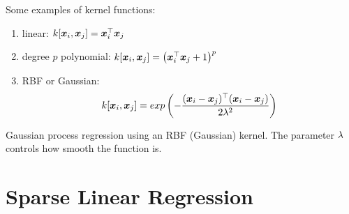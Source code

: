Some examples of kernel functions:
\begin{enumerate}
	\item linear: $k[\boldsymbol{x}_i,\boldsymbol{x}_j]=\boldsymbol{x}_i^\top\boldsymbol{x}_j$
	\item degree $p$ polynomial: $k[\boldsymbol{x}_i,\boldsymbol{x}_j]=\left(\boldsymbol{x}_i^\top\boldsymbol{x}_j+1\right)^p$
	\item RBF or Gaussian:
	\begin{align*}
		k[\boldsymbol{x}_i,\boldsymbol{x}_j]=exp\left(-\frac{(\boldsymbol{x}_i-\boldsymbol{x}_j){}^\top(\boldsymbol{x}_i-\boldsymbol{x}_j)}{2\lambda^2}\right)
	\end{align*}
\end{enumerate}
Gaussian process regression using an RBF (Gaussian) kernel. The parameter $\lambda$ controls how smooth the function is.

\section{Sparse Linear Regression}

